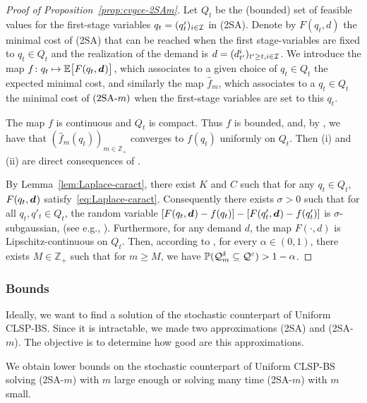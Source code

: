\begin{proof}[Proof of Proposition~\ref{prop:cvgce-2SAm}]
Let $Q_t$ be the (bounded) set of feasible values for the first-stage variables $q_t=(q_t^i)_{i\in\mathcal{I}}$ in (2SA).
Denote by $F(q_t,d)$ the minimal cost of (2SA) that can be reached when the first stage-variables are fixed to $q_t\in Q_t$  and the realization of the demand is $d=(d_{t'}^i)_{t' \geq t, i\in\mathcal{I}}$.
We introduce the map $f\colon q_t\mapsto \espe\sqbracket{F(q_t,\va d)}$, which associates to a given choice of $q_t\in Q_t$ the expected minimal cost, and similarly the map $\hat f_m$, which associates to a $q_t\in Q_t$ the minimal cost of $\textup{(2SA-$m$)}$ when the first-stage variables are set to this $q_t$.

The map $f$ is continuous and $Q_t$ is compact. Thus $f$ is bounded, and, by \cite[Theorem 7.48]{Shapiro2009}, we have that $(\hat f_m(q_t))_{m\in\mathbb{Z}_+}$ converges to $f(q_t)$ uniformly on $Q_t$. Then (i) and (ii) are direct consequences of \cite[Theorem 5.3]{Shapiro2009}.

By Lemma~\ref{lem:Laplace-caract}, there exist $K$ and $C$ such that for any $q_t \in Q_t$, $F(q_t,\va d)$ satisfy~\eqref{eq:Laplace-caract}.
Consequently there exists $\sigma >0$ such that for all $q_t, q'_t \in Q_t$, the random variable $[F(q_t,\va d) - f(q_t)] - [F(q'_t,\va d) - f(q'_t)] $ is $\sigma$-subgaussian, (see e.g., \cite{Vershynin2010}).
Furthermore, for any demand $d$, the map $F(\cdot,d)$ is %
Lipschitz-continuous on $Q_t$. Then, according to \cite[Theorem 5.18]{Shapiro2009}, for every $\alpha\in(0,1)$, there exists $M \in \mathbb{Z}_+$ such that for $m\geq M$, we have $ \mathbb{P}(\mathcal{Q}_m^{\delta}\subseteq\mathcal{Q}^{\varepsilon}) > 1 - \alpha$.
\end{proof}




\subsubsection{Bounds}


Ideally, we want to find a solution of the stochastic counterpart of Uniform CLSP-BS. Since it is intractable, we made two approximations (2SA) and (2SA-$m$). The objective is to determine how good are this approximations.

We obtain lower bounds on the stochastic counterpart of Uniform CLSP-BS solving (2SA-$m$) with $m$ large enough or solving many time (2SA-$m$) with $m$ small.


